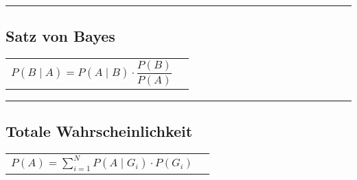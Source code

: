 \hrule

	\subsection{Satz von Bayes  }
		\begin{tabular}{ll}
		$P(B\mid A)=P(A\mid B) \cdot\dfrac{P(B)}{P(A)}$\vspace{1mm}
		\end{tabular}

\hrule
	\subsection{Totale Wahrscheinlichkeit  }
		\begin{tabular}{ll}
        $P(A)=\sum\limits_{i=1}^N P(A\mid G_i)\cdot P(G_i)$
        \end{tabular}